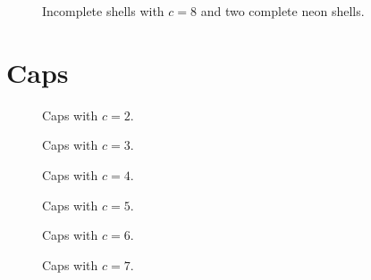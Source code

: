 \begin{figure}[h]
\begin{minipage}{0.48\textwidth}
    \centering
    
    \caption{Incomplete shells with $c=8$ and two complete neon shells.}
    \label{incompl01-core08-core2neon}
\end{minipage}
\hfill
\begin{minipage}{0.48\textwidth}
    \centering
\end{minipage}
\end{figure}

\vfill
\clearpage
\pagebreak

\section{Caps}
\begin{figure}[h]
\begin{minipage}{0.48\textwidth}
    \centering
    
    \caption{Caps with $c=2$.}
    \label{cap02}
\end{minipage}
\hfill
\begin{minipage}{0.48\textwidth}
    \centering
    
    \caption{Caps with $c=3$.}
    \label{cap03}
\end{minipage}
\end{figure}

\begin{figure}[h]
\begin{minipage}{0.48\textwidth}
    \centering
    
    \caption{Caps with $c=4$.}
    \label{cap04}
\end{minipage}
\hfill
\begin{minipage}{0.48\textwidth}
    \centering
    
    \caption{Caps with $c=5$.}
    \label{cap05}
\end{minipage}
\end{figure}

\begin{figure}[h]
\begin{minipage}{0.48\textwidth}
    \centering
    
    \caption{Caps with $c=6$.}
    \label{cap06}
\end{minipage}
\hfill
\begin{minipage}{0.48\textwidth}
    \centering
    
    \caption{Caps with $c=7$.}
    \label{cap07}
\end{minipage}
\end{figure}

